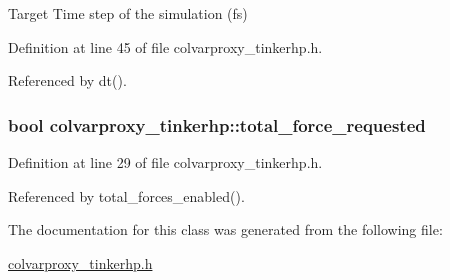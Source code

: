 Target Time step of the simulation (fs) 



Definition at line 45 of file colvarproxy\-\_\-tinkerhp.\-h.



Referenced by dt().

\hypertarget{classcolvarproxy__tinkerhp_a46e10d9afd59cffa031381605e6bf986}{
\subsubsection[{total\-\_\-force\-\_\-requested}]{\setlength{\rightskip}{0pt plus 5cm}bool colvarproxy\-\_\-tinkerhp\-::total\-\_\-force\-\_\-requested\hspace{0.3cm}{\ttfamily [private]}}}\label{classcolvarproxy__tinkerhp_a46e10d9afd59cffa031381605e6bf986}


Definition at line 29 of file colvarproxy\-\_\-tinkerhp.\-h.



Referenced by total\-\_\-forces\-\_\-enabled().



The documentation for this class was generated from the following file\-:\begin{DoxyCompactItemize}
\item 
\hyperlink{colvarproxy__tinkerhp_8h}{colvarproxy\-\_\-tinkerhp.\-h}\end{DoxyCompactItemize}
